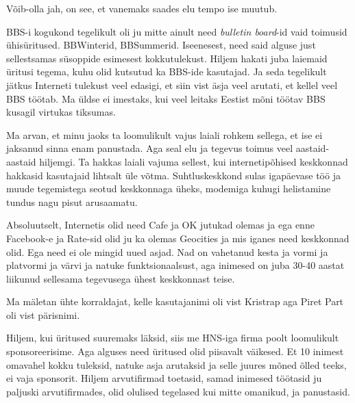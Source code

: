 
Võib-olla jah, on see, et vanemaks saades elu tempo ise muutub.


BBS-i kogukond tegelikult oli ju mitte ainult need \emph{bulletin board}-id 
vaid toimusid ühisüritused. BBWinterid, 
BBSummerid. Iseenesest, need said alguse just sellestsamas 
süsoppide esimesest kokkutulekust. Hiljem hakati juba laiemaid üritusi  
tegema, kuhu olid kutsutud ka BBS-ide kasutajad. Ja seda tegelikult jätkus  
Interneti tulekust veel edasigi, et siin vist äsja veel arutati, et kellel veel 
BBS töötab. Ma üldse ei imestaks, kui veel leitaks Eestist mõni töötav BBS 
kusagil virtukas tiksumas. 

Ma arvan, et minu jaoks ta loomulikult vajus laiali rohkem sellega, et ise ei 
jaksanud sinna enam panustada. Aga seal elu ja tegevus toimus veel 
aastaid-aastaid hiljemgi. Ta hakkas  laiali vajuma sellest, kui 
internetipõhised keskkonnad hakkasid  kasutajaid lihtsalt üle võtma. 
Suhtluskeskkond sulas igapäevase töö  ja muude tegemistega seotud keskkonnaga 
üheks, modemiga kuhugi helistamine tundus nagu pisut arusaamatu.


Absoluutselt, Internetis olid need Cafe ja OK jutukad  olemas ja ega enne 
Facebook-e ja Rate-sid olid ju ka olemas Geocities ja mis iganes need keskkonnad 
olid. Ega need ei ole mingid uued asjad. Nad on vahetanud kesta ja vormi ja 
platvormi ja värvi ja natuke funktsionaalsust, aga inimesed on juba 30-40 
aastat liikunud sellesama tegevusega  ühest keskkonnast teise.
                 

Ma mäletan ühte korraldajat, kelle kasutajanimi oli vist Kristrap aga Piret 
Part oli vist pärisnimi.


Hiljem, kui üritused suuremaks läksid, siis me HNS-iga firma poolt loomulikult 
sponsoreerisime. Aga alguses need üritused olid piisavalt väikesed. Et 10 
inimest omavahel kokku tuleksid, natuke asja arutaksid ja selle juures mõned 
õlled teeks, ei vaja sponsorit. Hiljem  arvutifirmad toetasid, samad inimesed 
töötasid ju paljuski arvutifirmades, olid olulised tegelased kui mitte 
omanikud, ja panustasid.

